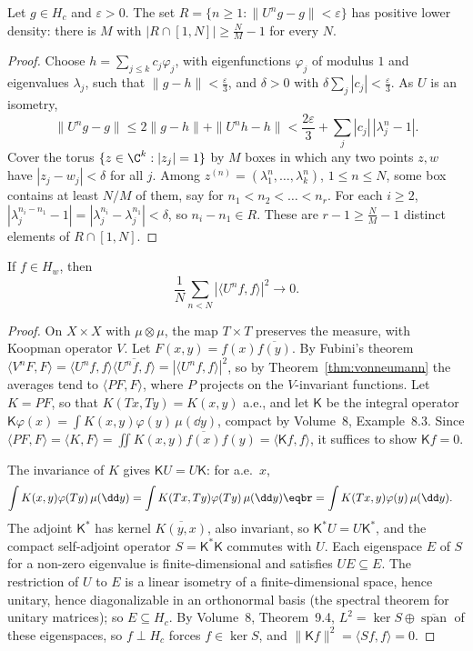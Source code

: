 \begin{lemma}\label{lem:almostperiodic}
Let $g\in H_c$ and $\varepsilon>0$. The set $R=\{n\ge1:\|U^ng-g\|<\varepsilon\}$ has positive lower density: there is $M$ with $|R\cap[1,N]|\ge\frac NM-1$ for every $N$.
\end{lemma}
\begin{proof}
Choose $h=\sum_{j\le k}c_j\varphi_j$, with eigenfunctions $\varphi_j$ of modulus $1$ and eigenvalues $\lambda_j$, such that $\|g-h\|<\frac\varepsilon3$, and $\delta>0$ with $\delta\sum_j|c_j|<\frac\varepsilon3$. As $U$ is an isometry,
\[
\|U^ng-g\|\le2\|g-h\|+\|U^nh-h\|<\frac{2\varepsilon}3+\sum_j|c_j|\,|\lambda_j^n-1|.
\]
Cover the torus $\{z\in\C^k:|z_j|=1\}$ by $M$ boxes in which any two points $z,w$ have $|z_j-w_j|<\delta$ for all $j$. Among $z^{(n)}=(\lambda_1^n,\dots,\lambda_k^n)$, $1\le n\le N$, some box contains at least $N/M$ of them, say for $n_1<n_2<\dots<n_r$.
For each $i\ge2$, $|\lambda_j^{n_i-n_1}-1|=|\lambda_j^{n_i}-\lambda_j^{n_1}|<\delta$, so $n_i-n_1\in R$. These are $r-1\ge\frac NM-1$ distinct elements of $R\cap[1,N]$.
\end{proof}

\begin{lemma}\label{lem:wm}
If $f\in H_w$, then
\[
\frac1N\sum_{n<N}|\langle U^nf,f\rangle|^2\longrightarrow0.
\]
\end{lemma}
\begin{proof}
On $X\times X$ with $\mu\otimes\mu$, the map $T\times T$ preserves the measure, with Koopman operator $V$. Let $F(x,y)=f(x)\overline{f(y)}$. By Fubini's theorem $\langle V^nF,F\rangle=\langle U^nf,f\rangle\overline{\langle U^nf,f\rangle}=|\langle U^nf,f\rangle|^2$, so by
Theorem~\ref{thm:vonneumann} the averages tend to $\langle PF,F\rangle$, where $P$ projects on the $V$-invariant functions. Let $K=PF$, so that $K(Tx,Ty)=K(x,y)$ a.e., and let $\mathsf K$ be the integral operator
$\mathsf K\varphi(x)=\int K(x,y)\varphi(y)\,\mu(\dd y)$, compact by Volume~8, Example~8.3. Since $\langle PF,F\rangle=\langle K,F\rangle=\iint K(x,y)\overline{f(x)}f(y)=\langle\mathsf Kf,f\rangle$, it suffices to show $\mathsf Kf=0$.

The invariance of $K$ gives $\mathsf KU=U\mathsf K$: for a.e.\ $x$,
\[
\begin{aligned}\int K(x,y)\varphi(Ty)\,\mu(\dd y)&=\int K(Tx,Ty)\varphi(Ty)\,\mu(\dd y)\eqbr=\int K(Tx,y)\varphi(y)\,\mu(\dd y).\end{aligned}
\]
The adjoint $\mathsf K^*$ has kernel $\overline{K(y,x)}$, also invariant,
so $\mathsf K^*U=U\mathsf K^*$, and the compact self-adjoint operator $S=\mathsf K^*\mathsf K$ commutes with $U$. Each eigenspace $E$ of $S$ for a non-zero eigenvalue is finite-dimensional and satisfies $UE\subseteq E$. The restriction of $U$ to $E$ is a linear
isometry of a finite-dimensional space, hence unitary, hence diagonalizable in an orthonormal basis (the spectral theorem for unitary matrices); so $E\subseteq H_c$. By Volume~8, Theorem~9.4, $L^2=\ker S\oplus\overline{\operatorname{span}}$ of these
eigenspaces, so $f\perp H_c$ forces $f\in\ker S$, and $\|\mathsf Kf\|^2=\langle Sf,f\rangle=0$.
\end{proof}

